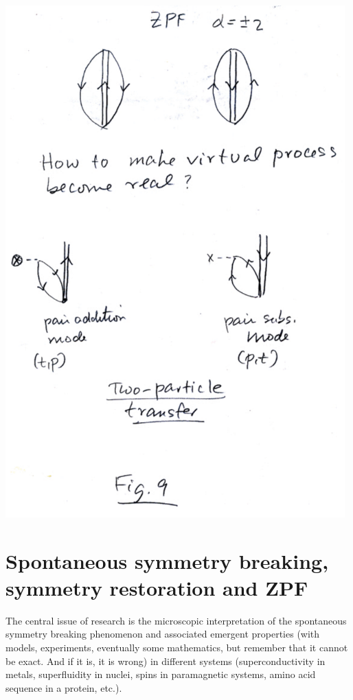 \documentclass[a4paper,onecolumn,superscriptaddress,12pt,nofootinbib,twoside,raggedfooter,notitlepage]{revtex4-1}
\begin{document}
\begin{center}
	\includegraphics[width=0.98\textwidth]{figs/fig_i7}
\end{center}


\appendix

\pagebreak

\section{Spontaneous symmetry breaking, symmetry restoration and ZPF}

The central issue of research is the microscopic interpretation of the spontaneous symmetry breaking phenomenon and associated emergent properties (with models, experiments, eventually some mathematics, but remember that it cannot be exact. And if it is, it is wrong) in different systems (superconductivity in metals, superfluidity in nuclei, spins in paramagnetic systems, amino acid sequence in a protein, etc.). 
\end{document}
